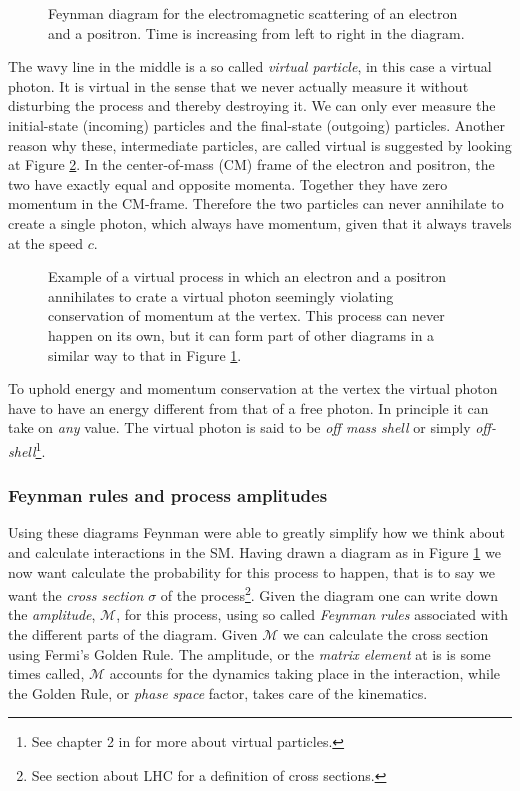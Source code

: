 \begin{figure}[htp]
\centering
	
\caption{Feynman diagram for the electromagnetic scattering of an electron and a positron. Time is increasing from left to right in the diagram.} \label{fig:feyn:ee_a_ee}
\end{figure}

The wavy line in the middle is a so called \emph{virtual particle}, in this case a virtual photon. It is virtual in the sense that we never actually measure it without disturbing the process and thereby destroying it. We can only ever measure the initial-state (incoming) particles and the final-state (outgoing) particles. Another reason why these, intermediate particles, are called virtual is suggested by looking at Figure \ref{fig:feyn:ee_a}. In the center-of-mass (CM) frame of the electron and positron, the two have exactly equal and opposite momenta. Together they have zero momentum in the CM-frame. Therefore the two particles can never annihilate to create a single photon, which always have momentum, given that it always travels at the speed $c$.

\begin{figure}[htp]
\centering
	
\caption{Example of a virtual process in which an electron and a positron annihilates to crate a virtual photon seemingly violating conservation of momentum at the vertex. This process can never happen on its own, but it can form part of other diagrams in a similar way to that in Figure \ref{fig:feyn:ee_a_ee}.} \label{fig:feyn:ee_a}
\end{figure}

To uphold energy and momentum conservation at the vertex the virtual photon have to have an energy different from that of a free photon. In principle it can take on \emph{any} value. The virtual photon is said to be \emph{off mass shell} or simply \emph{off-shell}\footnote{See chapter 2 in \cite{griffiths1987iep} for more about virtual particles.}.

\subsubsection{Feynman rules and process amplitudes}
Using these diagrams Feynman were able to greatly simplify how we think about and calculate interactions in the SM. Having drawn a diagram as in Figure \ref{fig:feyn:ee_a_ee} we now want calculate the probability for this process to happen, that is to say we want the \emph{cross section} $\sigma$ of the process\footnote{See section about LHC for a definition of cross sections.}. Given the diagram one can write down the \emph{amplitude}, $\mathcal{M}$, for this process, using so called \emph{Feynman rules} associated with the different parts of the diagram. Given $\mathcal{M}$ we can calculate the cross section using Fermi's Golden Rule. The amplitude, or the \emph{matrix element} at is is some times called, $\mathcal{M}$ accounts for the dynamics taking place in the interaction, while the Golden Rule, or \emph{phase space} factor, takes care of the kinematics.

